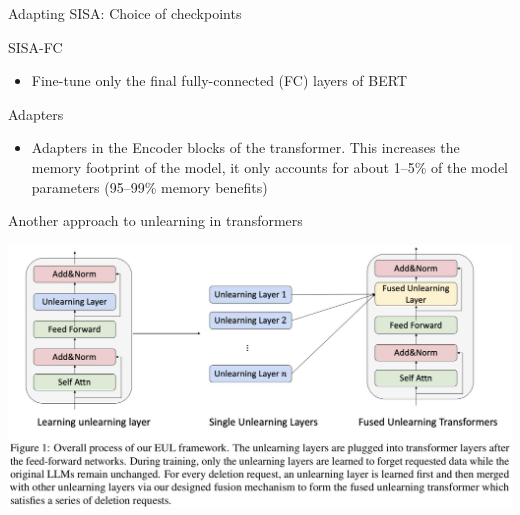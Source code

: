 \documentclass[12pt,aspectratio=169,handout]{beamer}
\begin{document}
\begin{frame}{Adapting SISA: Choice of checkpoints}

SISA-FC
\begin{itemize}
\item Fine-tune only the final fully-connected (FC) layers of BERT
\end{itemize}

Adapters \citep{Houlsby.et.al.2019.ICML}
\begin{itemize}
\item Adapters in the Encoder blocks of the transformer. This increases the memory footprint of the model, it only accounts for about 1--5\% of the model parameters (95--99\% memory benefits)
\end{itemize}





\end{frame}


\begin{frame}{Another approach to unlearning in transformers}

\includegraphics[width=\linewidth]{img/unlearning-emnlp.jpg}


\end{frame}
\end{document}

